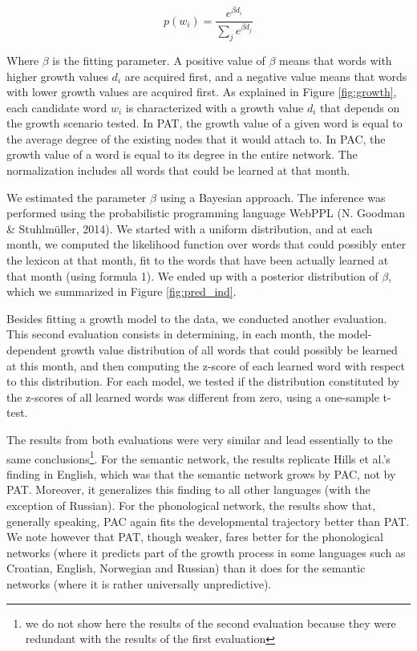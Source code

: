 \documentclass[10pt, letterpaper]{article}
\begin{document}
\begin{equation}
 p(w_i)= \frac{e^{\beta d_i}}{\sum_j e^{\beta d_j} }
\end{equation}

Where \(\beta\) is the fitting parameter. A positive value of \(\beta\)
means that words with higher growth values \(d_i\) are acquired first,
and a negative value means that words with lower growth values are
acquired first. As explained in Figure \ref{fig:growth}, each candidate
word \(w_i\) is characterized with a growth value \(d_i\) that depends
on the growth scenario tested. In PAT, the growth value of a given word
is equal to the average degree of the existing nodes that it would
attach to. In PAC, the growth value of a word is equal to its degree in
the entire network. The normalization includes all words that could be
learned at that month.

We estimated the parameter \(\beta\) using a Bayesian approach. The
inference was performed using the probabilistic programming language
WebPPL (N. Goodman \& Stuhlmüller, 2014). We started with a uniform
distribution, and at each month, we computed the likelihood function
over words that could possibly enter the lexicon at that month, fit to
the words that have been actually learned at that month (using formula
1). We ended up with a posterior distribution of \(\beta\), which we
summarized in Figure \ref{fig:pred_ind}.

Besides fitting a growth model to the data, we conducted another
evaluation. This second evaluation consists in determining, in each
month, the model-dependent growth value distribution of all words that
could possibly be learned at this month, and then computing the z-score
of each learned word with respect to this distribution. For each model,
we tested if the distribution constituted by the z-scores of all learned
words was different from zero, using a one-sample t-test.

The results from both evaluations were very similar and lead essentially
to the same
conclusions\footnote{we do not show here the results of the second evaluation because they were redundant with the results of the first evaluation}.
For the semantic network, the results replicate Hills et al.'s finding
in English, which was that the semantic network grows by PAC, not by
PAT. Moreover, it generalizes this finding to all other languages (with
the exception of Russian). For the phonological network, the results
show that, generally speaking, PAC again fits the developmental
trajectory better than PAT. We note however that PAT, though weaker,
fares better for the phonological networks (where it predicts part of
the growth process in some languages such as Croatian, English,
Norwegian and Russian) than it does for the semantic networks (where it
is rather universally unpredictive).
\end{document}
